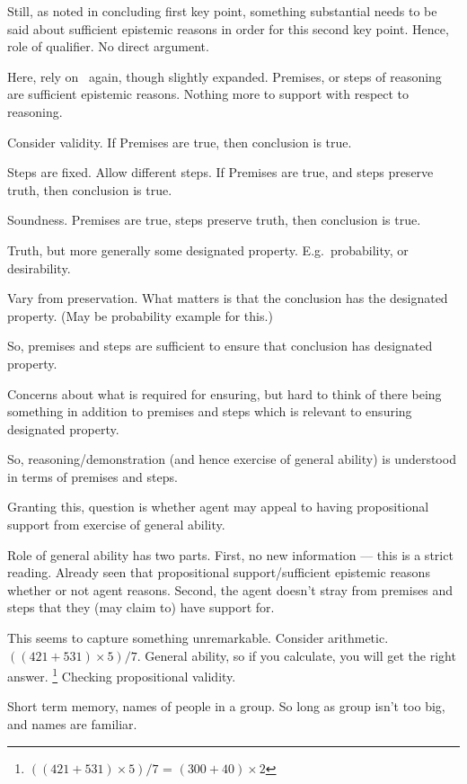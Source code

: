 \begin{note}
  Still, as noted in concluding first key point, something substantial needs to be said about sufficient epistemic reasons in order for this second key point.
  Hence, role of qualifier.
  No direct argument.

  Here, rely on~\USE{} again, though slightly expanded.
  Premises, or steps of reasoning are sufficient epistemic reasons.
  Nothing more to support with respect to reasoning.

  Consider validity.
  If Premises are true, then conclusion is true.

  Steps are fixed.
  Allow different steps.
  If Premises are true, and steps preserve truth, then conclusion is true.

  Soundness.
  Premises are true, steps preserve truth, then conclusion is true.

  Truth, but more generally some designated property.
  E.g.\ probability, or desirability.

  Vary from preservation.
  What matters is that the conclusion has the designated property.
  (May be probability example for this.)

  So, premises and steps are sufficient to ensure that conclusion has designated property.

  Concerns about what is required for ensuring, but hard to think of there being something in addition to premises and steps which is relevant to ensuring designated property.

  So, reasoning/demonstration (and hence exercise of general ability) is understood in terms of premises and steps.

  Granting this, question is whether agent may appeal to having propositional support from exercise of general ability.

  Role of general ability has two parts.
  First, no new information --- this is a strict reading.
  Already seen that propositional support/sufficient epistemic reasons whether or not agent reasons.
  Second, the agent doesn't stray from premises and steps that they (may claim to) have support for.

  This seems to capture something unremarkable.
  Consider arithmetic.
  \(((421 + 531) \times 5)/7\).
  General ability, so if you calculate, you will get the right answer.\nolinebreak
  \footnote{
    \(((421 + 531) \times 5)/7\) = \((300 + 40) \times 2\)
  }
  Checking propositional validity.

  Short term memory, names of people in a group.
  So long as group isn't too big, and names are familiar.


\end{note}
